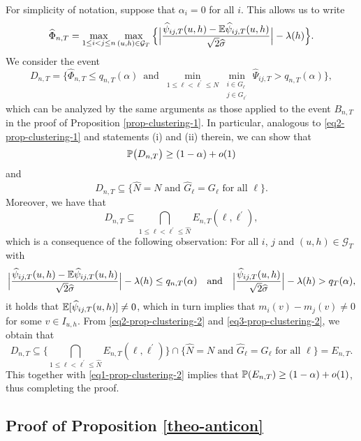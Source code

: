 \documentclass[a4paper,12pt]{article}
\begin{document}
For simplicity of notation, suppose that $\alpha_i = 0$ for all $i$. This allows us to write 
\[ \widehat{\Phi}_{n,T} = \max_{1 \le i < j \le n} \max_{(u,h) \in \mathcal{G}_T} \Big\{ \Big| \frac{\widehat{\psi}_{ij,T}(u,h)- \mathbb{E} \widehat{\psi}_{ij,T}(u,h)} {\sqrt{2}\widehat{\sigma}} \Big| - \lambda(h) \Big \}. \]
We consider the event
\[ D_{n,T} = \Big\{ \widehat{\Phi}_{n,T} \le q_{n,T}(\alpha) \, \text{ and } \,  \min_{1 \le \ell < \ell^\prime \le N} \min_{\substack{i \in G_\ell \\ j \in G_{\ell^\prime}}} \widehat{\Psi}_{ij,T} > q_{n,T}(\alpha) \Big\}, \]
which can be analyzed by the same arguments as those applied to the event $B_{n,T}$ in the proof of Proposition \ref{prop-clustering-1}. In particular, analogous to \eqref{eq2-prop-clustering-1} and statements (i) and (ii) therein, we can show that 
\begin{equation}\label{eq1-prop-clustering-2}
\mathbb{P} \big( D_{n,T} \big) \ge (1-\alpha) + o(1)
\end{equation}
and 
\begin{equation}\label{eq2-prop-clustering-2}
D_{n,T} \subseteq \big\{ \widehat{N} = N \text{ and } \widehat{G}_\ell = G_\ell \text{ for all } \ell \big\}.
\end{equation}
Moreover, we have that
\begin{equation}\label{eq3-prop-clustering-2}
D_{n,T} \subseteq \bigcap_{1 \le \ell < \ell^\prime \le \widehat{N}} E_{n,T}(\ell,\ell^\prime),
\end{equation}
which is a consequence of the following observation: For all $i$, $j$ and $(u,h) \in \mathcal{G}_T$ with 
\[ \Big|\frac{\widehat{\psi}_{ij,T}(u,h) - \mathbb{E} \widehat{\psi}_{ij,T}(u,h)}{\sqrt{2} \widehat{\sigma}}\Big| - \lambda(h) \le q_{n,T}(\alpha) \quad \text{and} \quad \Big|\frac{\widehat{\psi}_{ij,T}(u,h)}{\sqrt{2} \widehat{\sigma}}\Big| - \lambda(h) > q_T(\alpha), \]
it holds that $\mathbb{E}[\widehat{\psi}_{ij,T}(u,h)] \ne 0$, which in turn implies that $m_i(v) - m_j(v) \ne 0$ for some $v \in I_{u,h}$. From \eqref{eq2-prop-clustering-2} and \eqref{eq3-prop-clustering-2}, we obtain that 
\[ D_{n,T} \subseteq \Big\{ \bigcap_{1 \le \ell < \ell^\prime \le \widehat{N}} E_{n,T}(\ell,\ell^\prime) \Big\} \cap \big\{ \widehat{N} = N \text{ and } \widehat{G}_\ell = G_\ell \text{ for all } \ell \big\} = E_{n,T}. \] 
This together with \eqref{eq1-prop-clustering-2} implies that $\mathbb{P}(E_{n,T}) \ge (1-\alpha) + o(1)$, thus completing the proof. 



\subsection*{Proof of Proposition \ref{theo-anticon}}
\end{document}
